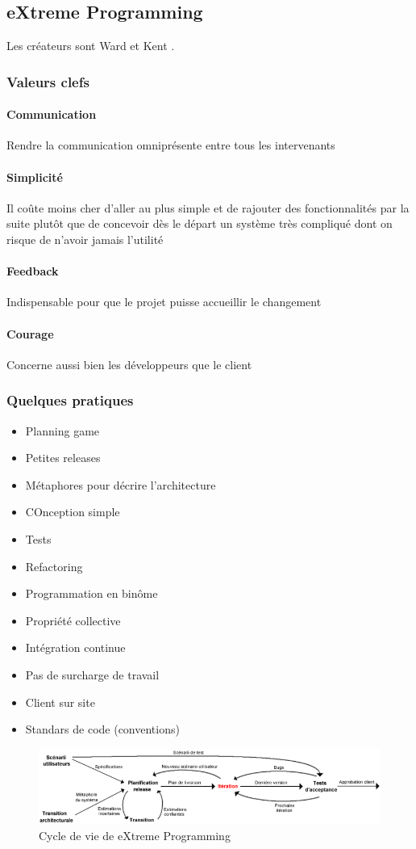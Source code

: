 	\subsection{eXtreme Programming}
	Les créateurs sont Ward  et Kent . 
	\subsubsection{Valeurs clefs}
	\paragraph{Communication} Rendre la communication omniprésente entre tous les intervenants
	\paragraph{Simplicité} Il coûte moins cher d'aller au plus simple et de rajouter des fonctionnalités par la suite plutôt que de concevoir dès le départ un
	système très compliqué dont on risque de n'avoir jamais l'utilité
	\paragraph{Feedback} Indispensable pour que le projet puisse accueillir le changement
	\paragraph{Courage} Concerne aussi bien les développeurs que le client
	\subsubsection{Quelques pratiques}	
		\begin{itemize}
			\item Planning game
			\item Petites releases
			\item Métaphores pour décrire l'architecture
			\item COnception simple
			\item Tests
			\item Refactoring 
			\item Programmation en binôme
			\item Propriété collective
			\item Intégration continue
			\item Pas de surcharge de travail
			\item Client sur site
			\item Standars de code (conventions)
		\end{itemize}
		\begin{figure}[H]
			\center
			\includegraphics[width=12cm]{images/4-extremeProgramming.png}
			\caption{Cycle de vie de eXtreme Programming}
		\end{figure}
		
